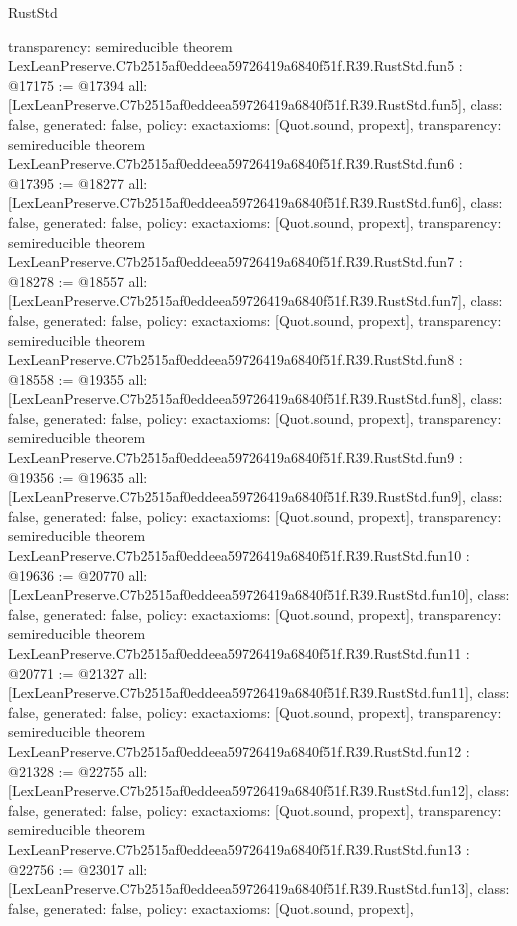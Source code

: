 \begin{lexlean}{RustStd}
\begin{coremodule}
{  transparency: semireducible
}
theorem LexLeanPreserve.C7b2515af0eddeea59726419a6840f51f.R39.RustStd.fun5 : @17175 := @17394 {
  all: [LexLeanPreserve.C7b2515af0eddeea59726419a6840f51f.R39.RustStd.fun5],
  class: false,
  generated: false,
  policy: exact{axioms: [Quot.sound, propext]},
  transparency: semireducible
}
theorem LexLeanPreserve.C7b2515af0eddeea59726419a6840f51f.R39.RustStd.fun6 : @17395 := @18277 {
  all: [LexLeanPreserve.C7b2515af0eddeea59726419a6840f51f.R39.RustStd.fun6],
  class: false,
  generated: false,
  policy: exact{axioms: [Quot.sound, propext]},
  transparency: semireducible
}
theorem LexLeanPreserve.C7b2515af0eddeea59726419a6840f51f.R39.RustStd.fun7 : @18278 := @18557 {
  all: [LexLeanPreserve.C7b2515af0eddeea59726419a6840f51f.R39.RustStd.fun7],
  class: false,
  generated: false,
  policy: exact{axioms: [Quot.sound, propext]},
  transparency: semireducible
}
theorem LexLeanPreserve.C7b2515af0eddeea59726419a6840f51f.R39.RustStd.fun8 : @18558 := @19355 {
  all: [LexLeanPreserve.C7b2515af0eddeea59726419a6840f51f.R39.RustStd.fun8],
  class: false,
  generated: false,
  policy: exact{axioms: [Quot.sound, propext]},
  transparency: semireducible
}
theorem LexLeanPreserve.C7b2515af0eddeea59726419a6840f51f.R39.RustStd.fun9 : @19356 := @19635 {
  all: [LexLeanPreserve.C7b2515af0eddeea59726419a6840f51f.R39.RustStd.fun9],
  class: false,
  generated: false,
  policy: exact{axioms: [Quot.sound, propext]},
  transparency: semireducible
}
theorem LexLeanPreserve.C7b2515af0eddeea59726419a6840f51f.R39.RustStd.fun10 : @19636 := @20770 {
  all: [LexLeanPreserve.C7b2515af0eddeea59726419a6840f51f.R39.RustStd.fun10],
  class: false,
  generated: false,
  policy: exact{axioms: [Quot.sound, propext]},
  transparency: semireducible
}
theorem LexLeanPreserve.C7b2515af0eddeea59726419a6840f51f.R39.RustStd.fun11 : @20771 := @21327 {
  all: [LexLeanPreserve.C7b2515af0eddeea59726419a6840f51f.R39.RustStd.fun11],
  class: false,
  generated: false,
  policy: exact{axioms: [Quot.sound, propext]},
  transparency: semireducible
}
theorem LexLeanPreserve.C7b2515af0eddeea59726419a6840f51f.R39.RustStd.fun12 : @21328 := @22755 {
  all: [LexLeanPreserve.C7b2515af0eddeea59726419a6840f51f.R39.RustStd.fun12],
  class: false,
  generated: false,
  policy: exact{axioms: [Quot.sound, propext]},
  transparency: semireducible
}
theorem LexLeanPreserve.C7b2515af0eddeea59726419a6840f51f.R39.RustStd.fun13 : @22756 := @23017 {
  all: [LexLeanPreserve.C7b2515af0eddeea59726419a6840f51f.R39.RustStd.fun13],
  class: false,
  generated: false,
  policy: exact{axioms: [Quot.sound, propext]},
}
\end{coremodule}
\end{lexlean}
